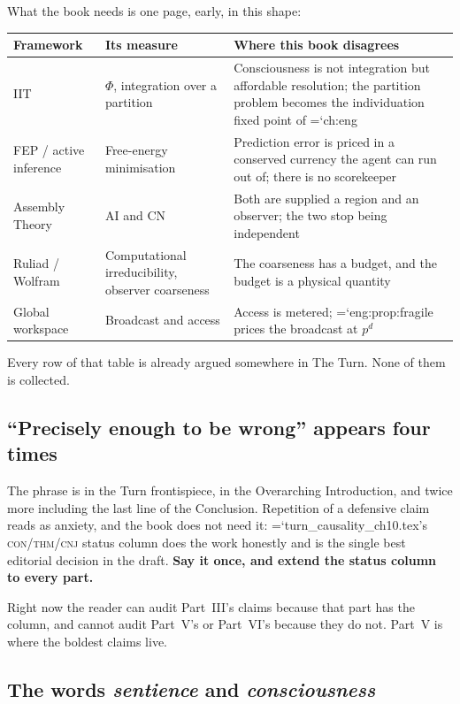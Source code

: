 \documentclass[11pt,letterpaper]{article}
\newcommand{\loc}[1]{{\small\ttfamily\color{accent}\hyphenchar\font=`\-\relax #1}}
\newcommand{\fnd}[1]{\textbf{\color{warn}#1}}
\newcommand{\AI}{\mathrm{AI}}
\newcommand{\CN}{\mathrm{CN}}
\begin{document}
What the book needs is one page, early, in this shape:

\begin{center}
\small
\begin{tabular}{@{}p{2.5cm}p{3.6cm}p{5.6cm}@{}}
\toprule
\textbf{Framework} & \textbf{Its measure} & \textbf{Where this book disagrees} \\
\midrule
IIT & $\Phi$, integration over a partition &
  Consciousness is not integration but affordable resolution; the
  partition problem becomes the individuation fixed point of
  \loc{ch:eng} \\
FEP / active inference & Free-energy minimisation &
  Prediction error is priced in a conserved currency the agent can run
  out of; there is no scorekeeper \\
Assembly Theory & $\AI$ and $\CN$ &
  Both are supplied a region and an observer; the two stop being
  independent \\
Ruliad / Wolfram & Computational irreducibility, observer coarseness &
  The coarseness has a budget, and the budget is a physical quantity \\
Global workspace & Broadcast and access &
  Access is metered; \loc{eng:prop:fragile} prices the broadcast at
  $p^{d}$ \\
\bottomrule
\end{tabular}
\end{center}

Every row of that table is already argued somewhere in The Turn. None
of them is collected.

\subsection*{``Precisely enough to be wrong'' appears four times}

The phrase is in the Turn frontispiece, in the Overarching
Introduction, and twice more including the last line of the
Conclusion. Repetition of a defensive claim reads as anxiety, and the
book does not need it: \loc{turn\_causality\_ch10.tex}'s
\textsc{con}/\textsc{thm}/\textsc{cnj} status column does the work
honestly and is the single best editorial decision in the draft.
\fnd{Say it once, and extend the status column to every part.}

Right now the reader can audit Part~III's claims because that part has
the column, and cannot audit Part~V's or Part~VI's because they do not.
Part~V is where the boldest claims live.

\subsection*{The words \emph{sentience} and \emph{consciousness}}
\end{document}
